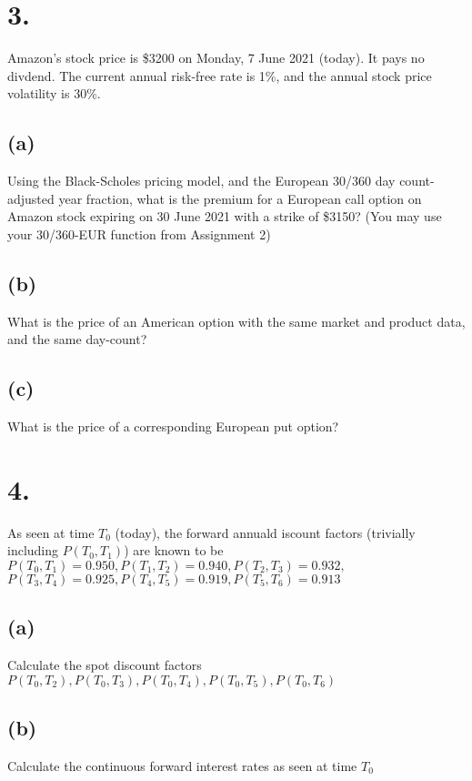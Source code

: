 \documentclass{article}
\begin{document}
\section*{3.}
{\Large 


Amazon's stock price is \$3200 on Monday, 7 June 2021 (today). It pays no divdend. The current annual risk-free rate is 1\%, and the annual stock price volatility is 30\%.

\subsection*{(a)}

Using the Black-Scholes pricing model, and the European 30/360 day count-adjusted year fraction, what is the premium for a European call option on Amazon stock expiring on 30 June 2021 with a strike of \$3150? (You may use your 30/360-EUR function from Assignment 2)

\subsection*{(b)}

What is the price of an American option with the same market and product data, and the same day-count?

\subsection*{(c)}

What is the price of a corresponding European put option?



\newpage
}

\section*{4.}
{\Large 


As seen at time $T_0$ (today), the forward annuald iscount factors (trivially including $P(T_0, T_1)$) are known to be \\
$P(T_0,T_1)=0.950, P(T_1,T_2)=0.940, P (T_2,T_3)=0.932,$ \\
$P(T_3,T_4)=0.925, P(T_4,T_5)=0.919, P(T_5,T_6)= 0.913$ 

\subsection*{(a)}

Calculate the spot discount factors $P(T_0,T_2),P (T_0,T_3),P(T_0,T_4), P(T_0,T_5), P(T_0,T_6)$

\subsection*{(b)}

Calculate the continuous forward interest rates as seen at time $T_0$

}
\end{document}
